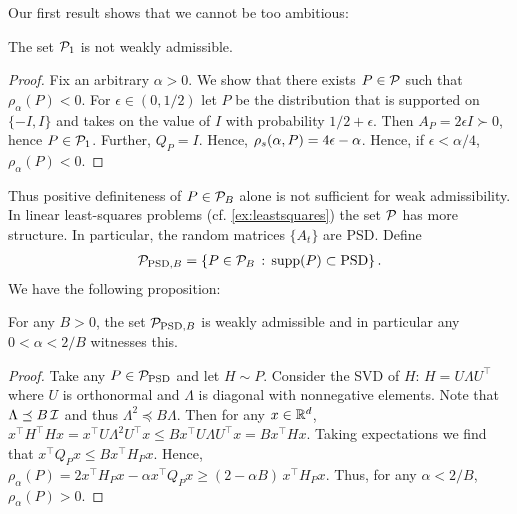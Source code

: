 Our first result shows that we cannot be too ambitious:
\begin{proposition}\label{notwad}
The set $\P_1$ is not weakly admissible.
\end{proposition}
\begin{proof}
Fix an arbitrary $\alpha>0$. We show that there exists $P\in \P$ such that $\rho_\alpha(P)<0$.
For $\epsilon \in (0,1/2)$ let $P$ be the distribution that is supported on $\{-I,I\}$ and takes on the value of $I$ with probability $1/2+\epsilon$. Then $A_P = 2\epsilon I \succ 0$, hence $P\in \P_1$. Further, $Q_P = I$.
Hence, $\rhos{P} = 4\epsilon-\alpha$. Hence, if $\epsilon<\alpha/4$, $\rho_\alpha(P)<0$.
\end{proof}
Thus  positive definiteness of $P\in \P_B$ alone is not sufficient for weak admissibility.
In linear least-squares problems (cf. \cref{ex:leastsquares}) the set $\P$ has more structure.
In particular, the random matrices $\{A_t\}$ are PSD. 
Define
\begin{align*}
\P_{\text{PSD},B} = \{ P \in \P_B \,:\,  \supp(P)\subset \text{PSD} \}\,.
\end{align*}
We have the following proposition:
\begin{proposition}
For any $B>0$, the set $\P_{\text{PSD},B}$ is weakly admissible
and in particular any $0<\alpha < 2/B$ witnesses this.
\end{proposition}
\begin{proof}
Take any $P\in \P_{\text{PSD}}$ and let $H\sim P$.
Consider the SVD of $H$: $H = U \Lambda U^\top$ where $U$ is orthonormal and $\Lambda$ is diagonal with
nonnegative elements. Note that $\Lambda \preceq B\, \I$ and thus $\Lambda^2 \preceq B \Lambda$.
Then for any $x\in \R^d$, $x^\top H^\top H x = x^\top U \Lambda^2 U^\top x \le B x^\top U \Lambda U^\top x = B x^\top H x$.
Taking expectations we find that $x^\top Q_P x \le B x^\top H_P x$.
Hence, $\rho_\alpha(P) = 2 x^\top H_P x - \alpha x^\top Q_P x \ge (2- \alpha B ) \,x^\top H_P x $.
Thus, for any $\alpha<2/B$, $\rho_\alpha(P)>0$.
\end{proof}

